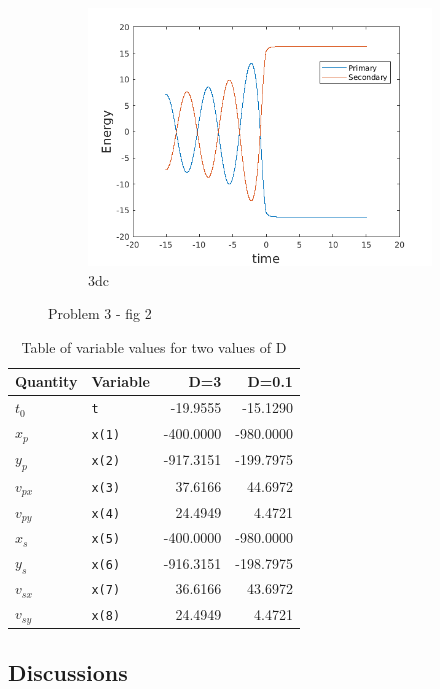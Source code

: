 \documentclass[a4paper]{article}
\begin{document}
\begin{figure}
			\begin{subfigure} {\columnwidth}
				\centering
				\includegraphics[width=.5\columnwidth]{../plots/3d_energy.png}
				\caption{3dc}
				\label{fig:3dc}
			\end{subfigure}
			\caption{Problem 3 - fig 2}
			\label{fig:3.2}
		\end{figure}
	
		\begin{table}
			\centering
			\begin{tabular} {l l r r}
				\toprule
				\textbf{Quantity} & \textbf{Variable} & \textbf{D=3} & \textbf{D=0.1}\\
				\midrule
				\(t^{}_{0}\) & \texttt{t} & -19.9555 & -15.1290 \\
				\(x^{}_{p}\) & \texttt{x(1)}& -400.0000 & -980.0000 \\
				\(y^{}_{p}\) & \texttt{x(2)} & -917.3151 & -199.7975 \\
				\(v^{}_{px}\) & \texttt{x(3)} & 37.6166 & 44.6972 \\
				\(v^{}_{py}\) & \texttt{x(4)} & 24.4949 & 4.4721 \\
				\(x^{}_{s}\) & \texttt{x(5)} & -400.0000 & -980.0000 \\
				\(y^{}_{s}\) & \texttt{x(6)} & -916.3151 & -198.7975 \\
				\(v^{}_{sx}\) & \texttt{x(7)} & 36.6166 & 43.6972 \\
				\(v^{}_{sy}\) & \texttt{x(8)} & 24.4949 & 4.4721 \\
				\bottomrule
			\end{tabular}
			\caption{Table of variable values for two values of D}
			\label{table:dvalues}
		\end{table}


		\subsection{Discussions} \label{3:discussions}
\end{document}
